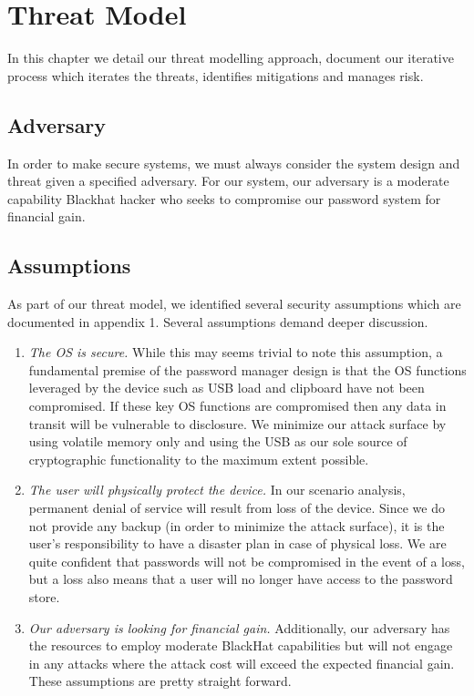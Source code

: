 \chapter{Threat Model}
\label{ch:threatmodel}
In this chapter we detail our threat modelling approach, document our iterative process which iterates the threats, identifies mitigations and manages risk.


\section{Adversary}
\label{sec:adversary}
In order to make secure systems, we must always consider the system design and threat given a specified adversary.  For our system, our adversary is a moderate capability Blackhat hacker who seeks to compromise our password system for financial gain.  

\section{Assumptions}
\label{sec:assumptions}
As part of our threat model, we identified several security assumptions which are documented in appendix 1.  Several assumptions demand deeper discussion.
\begin{enumerate}
    \item{\emph{The OS is secure.} While this may seems trivial to note this assumption, a fundamental premise of the password manager design is that the OS functions leveraged by the device such as USB load and clipboard have not been compromised.  If these key OS functions are compromised then any data in transit will be vulnerable to disclosure.  We minimize our attack surface by using volatile memory only and using the USB as our sole source of cryptographic functionality to the maximum extent possible.}
    \item{\emph{The user will physically protect the device.} In our scenario analysis, permanent denial of service will result from loss of the device.  Since we do not provide any backup (in order to minimize the attack surface), it is the user's responsibility to have a disaster plan in case of physical loss.  We are quite confident that passwords will not be compromised in the event of a loss, but a loss also means that a user will no longer have access to the password store.}
    \item{\emph{Our adversary is looking for financial gain.} Additionally, our adversary has the resources to employ moderate BlackHat capabilities but will not engage in any attacks where the attack cost will exceed the expected financial gain.}
These assumptions are pretty straight forward.
\end{enumerate}


